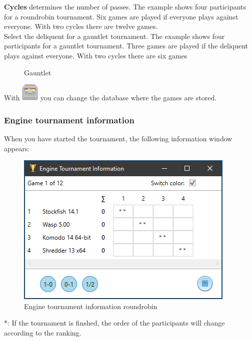 \documentclass[11pt,a4paper]{article}
\begin{document}
\textbf{Cycles} determines the number of passes. The example shows four participants for a roundrobin tournament. Six games are played if everyone plays against everyone. With two cycles there are twelve games.\\

Select the deliquent for a gauntlet tournament.  The example shows four participants for a gauntlet tournament. Three games are played if the deliquent plays against everyone. With two cycles there are six games


\begin{figure}[H]
	\centering 
	\caption{Gauntlet}
	\label{fig:EngineTournament4}
\end{figure}


With \includegraphics[scale=0.5]{file_manager.png} you can change the database where the games are stored.

\subsubsection{Engine tournament information}

When you have started the tournament, the following information window appears:

\begin{figure}[H]
	\centering
	\includegraphics[scale=1.0]{EngineTournament5.png}
	\caption{Engine tournament information roundrobin}
	\label{fig:EngineTournameent5}
\end{figure}
{\color{red}*}: If the tournament is finshed, the order of the participants will change according to the ranking.
\end{document}
